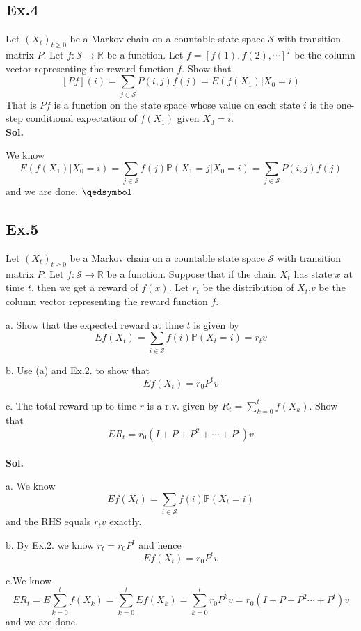 \documentclass[lang=en,11pt,a4paper,citestyle =authoryear]{elegantpaper}
\newcommand{\prvd}{$\hfill \qedsymbol$}
\newcommand{\R}{\mathbb{R}}
\newcommand{\Pb}{\mathbb{P}}
\begin{document}
\subsection*{Ex.4} 
Let $(X_t)_{t\geq 0}$ be a Markov chain on a countable state space $\mathscr{S}$ with transition matrix $P$. Let $f:\mathscr{S} \to \R$ be a function. Let $f= [f(1),f(2),\cdots]^T$ be the column vector representing the reward function $f$. Show that
\[[Pf](i) = \sum\limits_{j\in\mathscr{S}}P(i,j)f(j) = E(f(X_1)|X_0 = i)\]
That is $Pf$ is a function on the state space whose value on each state $i$ is the one-step conditional expectation of $f(X_1)$ given $X_0 = i$.
\vspace{0.5em}\\
\textbf{Sol.} \par
We know
\[
E(f(X_1)|X_0 = i) = \sum\limits_{j\in\mathscr{S}} f(j)\Pb(X_1 = j|X_0 = i) = \sum\limits_{j\in\mathscr{S}}P(i,j)f(j)
\]
and we are done.
\prvd
\vspace{0.5em}

\subsection*{Ex.5} 
Let $(X_t)_{t\geq 0}$ be a Markov chain on a countable state space $\mathscr{S}$ with transition matrix $P$. Let $f:\mathscr{S} \to \R$ be a function. Suppose that if the chain $X_t$ has state $x$ at time $t$, then we get a reward of $f(x)$. Let $r_t$ be the distribution of $X_t$,$v$ be the column vector representing the reward function $f$.\par
a. Show that the expected reward at time $t$ is given by
\[Ef(X_t) = \sum\limits_{i\in\mathscr{S}}f(i)\Pb(X_t = i) = r_tv\]\par
b. Use (a) and Ex.2. to show that
\[Ef(X_t) = r_0P^tv\]\par
c. The total reward up to time $r$ is a r.v. given by $R_t = \sum\limits_{k=0}^t f(X_k)$. Show that
\[ER_t = r_0(I+P+P^2+\cdots+P^t)v\]
\vspace{0.5em}\\
\textbf{Sol.} \par
a. We know
\[
Ef(X_t) = \sum\limits_{i\in\mathscr{S}} f(i)\Pb(X_t = i)
\]
and the RHS equals $r_t v$ exactly.\par
b. By Ex.2. we know $r_t = r_0P^t$ and hence
\[Ef(X_t) = r_0P^tv\]\par
c.We know
\[
ER_t = E\sum\limits_{k=0}^tf(X_k) = \sum\limits_{k=0}^t Ef(X_k) = \sum\limits_{k=0}^t r_0P^kv = r_0(I+P+P^2\cdots+P^t)v
\]
and we are done.
\vspace{0.5em}
\end{document}
